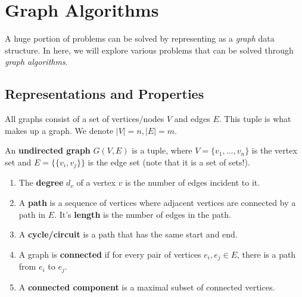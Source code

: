 \section{Graph Algorithms}

  A huge portion of problems can be solved by representing as a \textit{graph} data structure. In here, we will explore various problems that can be solved through \textit{graph algorithms}. 

\subsection{Representations and Properties}

  All graphs consist of a set of vertices/nodes $V$ and edges $E$. This tuple is what makes up a graph. We denote $|V| = n, |E| = m$. 

  \begin{definition}
    An \textbf{undirected graph} $G(V, E)$ is a tuple, where $V = \{v_1, \ldots, v_n\}$ is the vertex set and $E = \{\{v_i, v_j\}\}$ is the edge set (note that it is a set of sets!). 
    \begin{enumerate}
      \item The \textbf{degree} $d_v$ of a vertex $v$ is the number of edges incident to it. 
      \item A \textbf{path} is a sequence of vertices where adjacent vertices are connected by a path in $E$. It's \textbf{length} is the number of edges in the path. 
      \item A \textbf{cycle/circuit} is a path that has the same start and end. 
      \item A graph is \textbf{connected} if for every pair of vertices $e_i, e_j \in E$, there is a path from $e_i$ to $e_j$. 
      \item A \textbf{connected component} is a maximal subset of connected vertices. 
    \end{enumerate}
  \end{definition}

